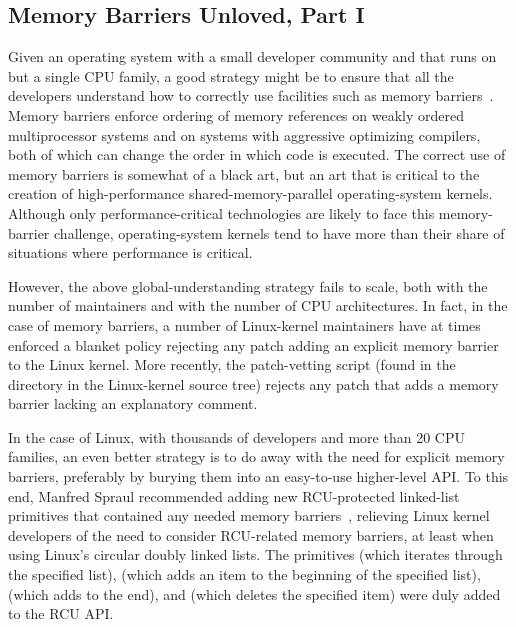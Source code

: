 \subsection{Memory Barriers Unloved, Part I}
\label{sec:app:rcuhist:Memory Barriers Unloved, Part I}

Given an operating system with a small developer community and that
runs on but a single CPU family, a good strategy might be to ensure that all
the developers understand how to correctly use facilities such as
memory barriers~\cite{Gharachorloo95}.
Memory barriers enforce ordering of memory references on weakly ordered
multiprocessor systems and on systems with aggressive optimizing
compilers, both of which can change the order in which code is executed.
The correct use of memory barriers is somewhat of
a black art, but an art that is critical to the creation of high-performance
shared-memory-parallel operating-system kernels.
Although only performance-critical technologies are
likely to face this memory-barrier challenge, operating-system kernels
tend to have more than their share of situations where performance
is critical.

However, the above global-understanding strategy
fails to scale,
both with the number of maintainers and with the number of CPU architectures.
In fact, in the case of memory barriers, a number of Linux-kernel
maintainers have at times enforced a blanket policy rejecting any patch
adding an explicit memory barrier to the Linux kernel.
More recently, the  patch-vetting script (found in
the  directory in the Linux-kernel source tree)
rejects any patch that adds a memory barrier lacking
an explanatory comment.

In the case of Linux, with thousands of developers and more than 20
CPU families, an even better strategy is to do away with the need
for explicit memory barriers, preferably by burying them into an
easy-to-use higher-level API.
To this end, Manfred Spraul recommended adding new RCU-protected
linked-list primitives that contained any needed
memory barriers~\cite{Spraul01},
relieving Linux kernel developers of the need to consider RCU-related
memory barriers, at least when using Linux's circular doubly linked lists.
The primitives  (which iterates through
the specified list),
 (which adds an item to the beginning of the specified
list),
 (which adds to the end),
and  (which deletes the specified item)
were duly added to the RCU API.

